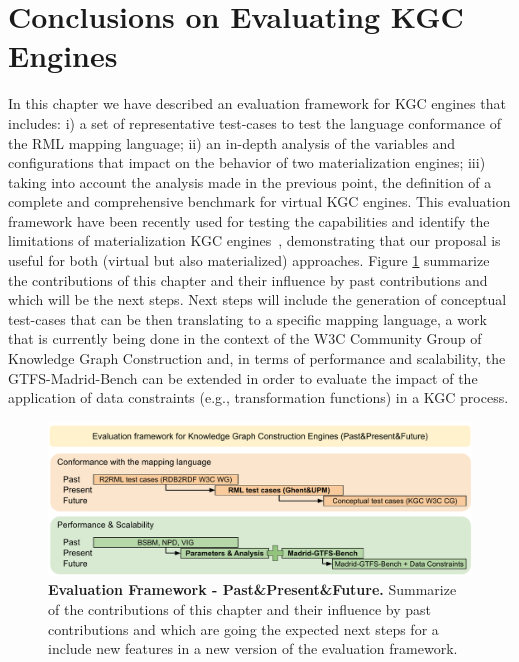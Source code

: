 \section{Conclusions on Evaluating KGC Engines}
In this chapter we have described an evaluation framework for KGC engines that includes: i) a set of representative test-cases to test the language conformance of the RML mapping language; ii) an in-depth analysis of the variables and configurations that impact on the behavior of two materialization engines; iii) taking into account the analysis made in the previous point, the definition of a complete and comprehensive benchmark for virtual KGC engines. This evaluation framework have been recently used for testing the capabilities and identify the limitations of materialization KGC engines~\citep{arenas2021knowledge}, demonstrating that our proposal is useful for both (virtual but also materialized) approaches. Figure \ref{fig:eval-framework} summarize the contributions of this chapter and their influence by past contributions and which will be the next steps. Next steps will include the generation of conceptual test-cases that can be then translating to a specific mapping language, a work that is currently being done in the context of the W3C Community Group of Knowledge Graph Construction and, in terms of performance and scalability, the GTFS-Madrid-Bench can be extended in order to evaluate the impact of the application of data constraints (e.g., transformation functions) in a KGC process.

\begin{figure}
    \centering
    \includegraphics[angle=90,width=0.5\linewidth]{figures/Evaluation Framework.pdf}
    \caption[Evaluation Framework - Past\&Present\&Future]{\textbf{Evaluation Framework - Past\&Present\&Future.} Summarize of the contributions of this chapter and their influence by past contributions and which are going the expected next steps for a include new features in a new version of the evaluation framework.}
    \label{fig:eval-framework}
\end{figure}